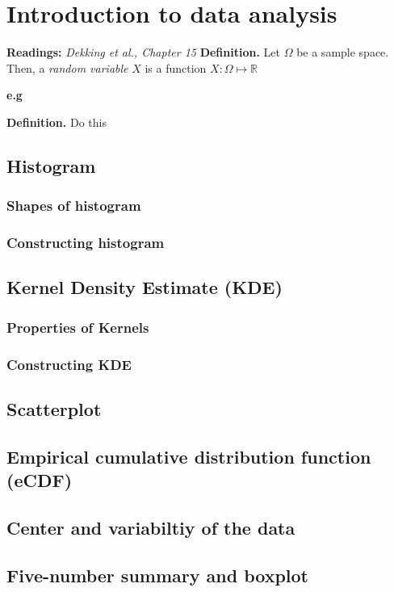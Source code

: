 \documentclass[a4paper]{article}
\begin{document}
\newpage

\newpage
\section{Introduction to data analysis}
\textbf{Readings:} \textit{Dekking et al., Chapter 15}
\newline
\textbf{Definition.} Let $\Omega$ be a sample space. Then, a \textit{random variable} $X$ is a function $X : \Omega \mapsto \mathbb{R}$

\textbf{e.g}

\textbf{Definition.} Do this
    
    \subsection{Histogram}
        \subsubsection*{Shapes of histogram}
        \subsubsection*{Constructing histogram}
    \subsection{Kernel Density Estimate (KDE)}
        \subsubsection*{Properties of Kernels}
        \subsubsection*{Constructing KDE}
    \subsection{Scatterplot}

    \subsection{Empirical cumulative distribution function (eCDF)}
    \subsection{Center and variabiltiy of the data}
    \subsection{Five-number summary and boxplot}
\end{document}
